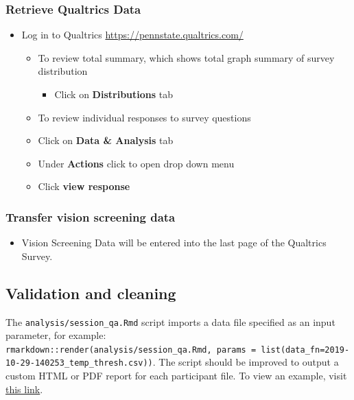 \documentclass[]{article}
\providecommand{\tightlist}{%
  \setlength{\itemsep}{0pt}\setlength{\parskip}{0pt}}
\begin{document}
\hypertarget{retrieve-qualtrics-data}{%
\subsubsection{Retrieve Qualtrics Data}\label{retrieve-qualtrics-data}}

\begin{itemize}
\tightlist
\item
  Log in to Qualtrics \url{https://pennstate.qualtrics.com/}

  \begin{itemize}
  \tightlist
  \item
    To review total summary, which shows total graph summary of survey
    distribution

    \begin{itemize}
    \tightlist
    \item
      Click on \textbf{Distributions} tab
    \end{itemize}
  \item
    To review individual responses to survey questions
  \item
    Click on \textbf{Data \& Analysis} tab
  \item
    Under \textbf{Actions} click to open drop down menu
  \item
    Click \textbf{view response}
  \end{itemize}
\end{itemize}

\hypertarget{transfer-vision-screening-data}{%
\subsubsection{Transfer vision screening
data}\label{transfer-vision-screening-data}}

\begin{itemize}
\tightlist
\item
  Vision Screening Data will be entered into the last page of the
  Qualtrics Survey.
\end{itemize}

\hypertarget{validation-and-cleaning}{%
\subsection{Validation and cleaning}\label{validation-and-cleaning}}

The \texttt{analysis/session\_qa.Rmd} script imports a data file
specified as an input parameter, for example:
\texttt{rmarkdown::render(\textquotesingle{}analysis/session\_qa.Rmd\textquotesingle{},\ params\ =\ list(data\_fn=\textquotesingle{}2019-10-29-140253\_temp\_thresh.csv\textquotesingle{}))}.
The script should be improved to output a custom HTML or PDF report for
each participant file. To view an example, visit
\href{https://gilmore-lab.github.io/sex-differences-in-motion-perception/analysis/session_qa.html}{this
link}.
\end{document}
